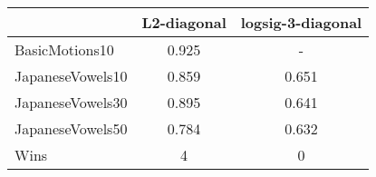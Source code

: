 \begin{tabular}{lcc}
\toprule
{} &  L2-diagonal &  logsig-3-diagonal \\
\midrule
BasicMotions10   &        0.925 &                  - \\
JapaneseVowels10 &        0.859 &              0.651 \\
JapaneseVowels30 &        0.895 &              0.641 \\
JapaneseVowels50 &        0.784 &              0.632 \\ 
\midrule
Wins &            4 &                  0 \\
\bottomrule
\end{tabular}
